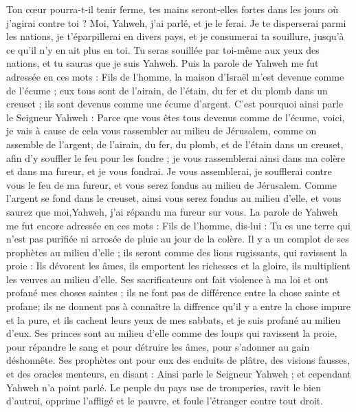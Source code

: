 \begin{multicols}{2}
Ton cœur pourra-t-il tenir ferme, tes mains seront-elles fortes dans les jours où j'agirai contre toi ? Moi, Yahweh, j'ai parlé, et je le ferai.
Je te disperserai parmi les nations, je t'éparpillerai en divers pays, et je consumerai ta souillure, jusqu'à ce qu'il n'y en ait plus en toi.
Tu seras souillée par toi-même aux yeux des nations, et tu sauras que je suis Yahweh.
Puis la parole de Yahweh me fut adressée en ces mots :
Fils de l'homme, la maison d'Israël m'est devenue comme de l'écume ; eux tous sont de l'airain, de l'étain, du fer et du plomb dans un creuset ; ils sont devenus comme une écume d'argent.
C'est pourquoi ainsi parle le Seigneur Yahweh : Parce que vous êtes tous devenus comme de l'écume, voici, je vais à cause de cela vous rassembler au milieu de Jérusalem,
comme on assemble de l'argent, de l'airain, du fer, du plomb, et de l'étain dans un creuset, afin d'y souffler le feu pour les fondre ; je vous rassemblerai ainsi dans ma colère et dans ma fureur, et je vous fondrai.
Je vous assemblerai, je soufflerai contre vous le feu de ma fureur, et vous serez fondus au milieu de Jérusalem.
Comme l'argent se fond dans le creuset, ainsi vous serez fondus au milieu d'elle, et vous saurez que moi,Yahweh, j'ai répandu ma fureur sur vous.
La parole de Yahweh me fut encore adressée en ces mots :
Fils de l'homme, dis-lui : Tu es une terre qui n'est pas purifiée ni arrosée de pluie au jour de la colère.
Il y a un complot de ses prophètes au milieu d'elle ; ils seront comme des lions rugissants, qui ravissent la proie : Ils dévorent les âmes, ils emportent les richesses et la gloire, ils multiplient les veuves au milieu d'elle.
Ses sacrificateurs ont fait violence à ma loi et ont profané mes choses saintes ; ils ne font pas de différence entre la chose sainte et profane; ils ne donnent pas à connaître la diffrence qu'il y a entre la chose impure et la pure, et ils cachent leurs yeux de mes sabbats, et je suis profané au milieu d'eux.
Ses princes sont au milieu d'elle comme des loups qui ravissent la proie, pour répandre le sang et pour détruire les âmes, pour s'adonner au gain déshonnête.
Ses prophètes ont pour eux des enduits de plâtre, des visions fausses, et des oracles menteurs, en disant : Ainsi parle le Seigneur Yahweh ; et cependant Yahweh n'a point parlé.
Le peuple du pays use de tromperies, ravit le bien d'autrui, opprime l'affligé et le pauvre, et foule l'étranger contre tout droit.

\end{multicols}
